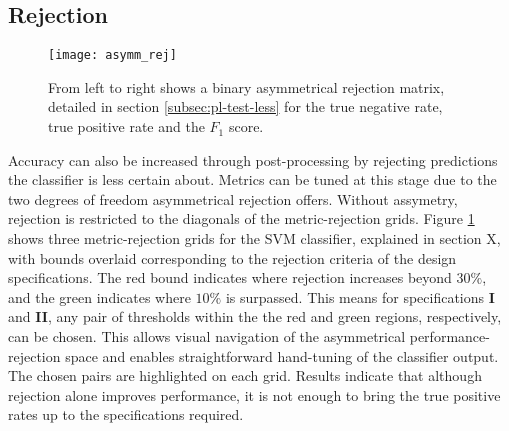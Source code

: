     \subsection{Rejection}
    \label{subsec:exp-postproc-rej}
        \begin{figure}[ht]
            \centering
            \texttt{[image: asymm\_rej]}
            \caption{From left to right shows a binary asymmetrical rejection matrix, detailed in section \ref{subsec:pl-test-less} for the true negative rate, true positive rate and the $F_1$ score.}
            \label{fig:exp-postproc-asymrej}
        \end{figure}
        Accuracy can also be increased through post-processing by rejecting predictions the classifier is less certain about. Metrics can be tuned at this stage due to the two degrees of freedom asymmetrical rejection offers. Without assymetry, rejection is restricted to the diagonals of the metric-rejection grids. Figure \ref{fig:exp-postproc-asymrej} shows three metric-rejection grids for the SVM classifier, explained in section X, with bounds overlaid corresponding to the rejection criteria of the design specifications. The red bound indicates where rejection increases beyond $30\%$, and the green indicates where $10\%$ is surpassed. This means for specifications \textbf{I} and \textbf{II}, any pair of thresholds within the the red and green regions, respectively, can be chosen. This allows visual navigation of the asymmetrical performance-rejection space and enables straightforward hand-tuning of the classifier output. The chosen pairs are highlighted on each grid. Results indicate that although rejection alone improves performance, it is not enough to bring the true positive rates up to the specifications required.
    
